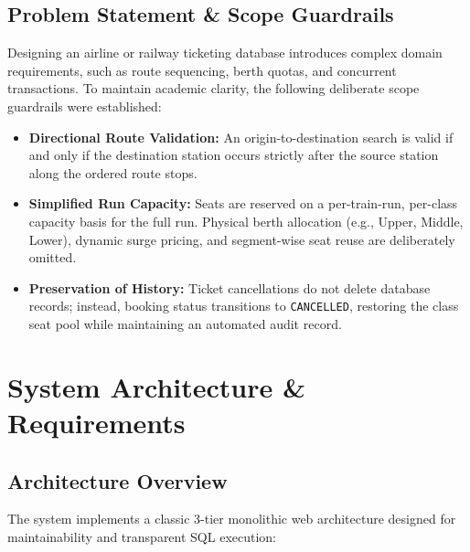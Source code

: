 \documentclass[12pt,a4paper]{report}
\begin{document}
\section{Problem Statement \& Scope Guardrails}
Designing an airline or railway ticketing database introduces complex domain requirements, such as route sequencing, berth quotas, and concurrent transactions. To maintain academic clarity, the following deliberate scope guardrails were established:
\begin{itemize}
    \item \textbf{Directional Route Validation:} An origin-to-destination search is valid if and only if the destination station occurs strictly after the source station along the ordered route stops.
    \item \textbf{Simplified Run Capacity:} Seats are reserved on a per-train-run, per-class capacity basis for the full run. Physical berth allocation (e.g., Upper, Middle, Lower), dynamic surge pricing, and segment-wise seat reuse are deliberately omitted.
    \item \textbf{Preservation of History:} Ticket cancellations do not delete database records; instead, booking status transitions to \texttt{CANCELLED}, restoring the class seat pool while maintaining an automated audit record.
\end{itemize}

\chapter{System Architecture \& Requirements}

\section{Architecture Overview}
The system implements a classic 3-tier monolithic web architecture designed for maintainability and transparent SQL execution:
\end{document}
